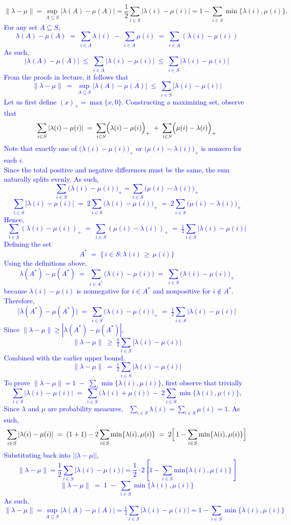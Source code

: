\documentclass{article}
\begin{document}
\[
\|\lambda - \mu\| = \sup_{A \subseteq S} |\lambda(A) - \mu(A)| = \frac{1}{2} \sum_{i \in S} |\lambda(i) - \mu(i)| = 1 - \sum_{i \in S} \min\{\lambda(i), \mu(i)\}.
\]
\textcolor{blue}{
For any set \(A \subseteq S\), 
\[
\lambda(A) - \mu(A) 
\;=\; \sum_{i \in A} \lambda(i) \;-\; \sum_{i \in A} \mu(i)
\;=\; \sum_{i \in A} (\lambda(i) - \mu(i))
\]
As such, 
\[
|\lambda(A) - \mu(A)|
\;\le\; \sum_{i \in A} |\lambda(i) - \mu(i)|
\;\le\; \sum_{i \in S} |\lambda(i) - \mu(i)|
\]
From the proofs in lecture, it follows that
\[
\|\lambda - \mu\| 
\;=\; \sup_{A \subseteq S} |\lambda(A) - \mu(A)|
\;\le\; \sum_{i \in S} |\lambda(i) - \mu(i)|
\]
Let us first define $(x)_+ = \max\{x,0\}$. Constructing a maximizing set, observe that 
\[
\sum_{i \in S} |\lambda(i) - \mu(i)|
\;=\; \sum_{i \in S} \Bigl(\lambda(i) - \mu(i)\Bigr)_+ 
\;+\; \sum_{i \in S} \Bigl(\mu(i) - \lambda(i)\Bigr)_+
\]
Note that exactly one of \(\bigl(\lambda(i)-\mu(i)\bigr)_+\) or \(\bigl(\mu(i)-\lambda(i)\bigr)_+\) is nonzero for each \(i\). \\
Since the total positive and negative differences must be the same, the sum naturally splits evenly. As such,
$$\sum_{i\in S}\bigl(\lambda(i)-\mu(i)\bigr)_+=\sum_{i \in S}\bigl(\mu(i)-\lambda(i)\bigr)_+$$
\[
\sum_{i \in S} \bigl|\lambda(i) - \mu(i)\bigr|
\;=\; 2 \sum_{i \in S} \bigl(\lambda(i) - \mu(i)\bigr)_+ 
\;=\; 2 \sum_{i \in S} \bigl(\mu(i) - \lambda(i)\bigr)_+
\]
Hence,
\[
\sum_{i \in S} (\lambda(i)-\mu(i))_+
\;=\;
\sum_{i \in S} (\mu(i)-\lambda(i))_+
\;=\;
\tfrac12 \sum_{i \in S} |\lambda(i) - \mu(i)|
\]
Defining the set
\[
A^* \;=\; \{\,i \in S : \lambda(i) \,\ge\, \mu(i)\}
\]
Using the definitions above,
\[
\lambda(A^*) - \mu(A^*)
\;=\; \sum_{i \in A^*} \bigl(\lambda(i) - \mu(i)\bigr)
\;=\; \sum_{i \in S} \bigl(\lambda(i)-\mu(i)\bigr)_+
\]
because \(\lambda(i)-\mu(i)\) is nonnegative for $i \in A^*$ and nonpositive for $i\notin A^*$. Therefore,
\[
\bigl|\lambda(A^*) - \mu(A^*)\bigr|
\;=\;
\sum_{i \in S} \bigl(\lambda(i)-\mu(i)\bigr)_+
\;=\;
\tfrac12 \sum_{i \in S} \bigl|\lambda(i) - \mu(i)\bigr|
\]
Since $\|\lambda-\mu\| \ge |\lambda(A^*) - \mu(A^*)|$, 
\[
\|\lambda - \mu\|
\;\ge\;
\tfrac12 \sum_{i \in S} \bigl|\lambda(i) - \mu(i)\bigr|
\]
Combined with the earlier upper bound,
\[
\|\lambda - \mu\|
\;=\;
\tfrac12 \sum_{i \in S} \bigl|\lambda(i) - \mu(i)\bigr|
\]
\medskip
\noindent
To prove \(\displaystyle \|\lambda - \mu\| = 1 \;-\;\sum_{i} \min\{\lambda(i), \mu(i)\}\), first observe that trivially
\[
\sum_{i \in S} |\lambda(i) - \mu(i)|
\;=\;
\sum_{i \in S} \bigl(\lambda(i) + \mu(i)\bigr)
\;-\; 2 \sum_{i \in S} \min\{\lambda(i), \mu(i)\},
\]
Since $\lambda$ and $\mu$ are probability measures, \ $\sum_{i \in S}\lambda(i)=\sum_{i \in S}\mu(i)=1$. As such,
\[
\sum_{i \in S} |\lambda(i) - \mu(i)|
\;=\;
(1+1) - 2\sum_{i \in S} \min\{\lambda(i), \mu(i)\}
\;=\;
2 \Bigl[\,1 - \sum_{i \in S} \min\{\lambda(i), \mu(i)\}\Bigr]
\]
Substituting back into $||\lambda - \mu||$,
$$\|\lambda-\mu\| = \frac12 \sum_{i \in S}|\lambda(i)-\mu(i)| = \frac12 \cdot 2 \left[1 - \sum_{i\in S}\text{min}\{\lambda (i), \mu (i)\}\right]$$
\[
\|\lambda - \mu\|
\;=\;
1 \;-\; \sum_{i \in S} \min\{\lambda(i), \mu(i)\}
\]
As such,
\[
\|\lambda - \mu\| = \sup_{A \subseteq S} \bigl|\lambda(A) - \mu(A)\bigr| = 
\tfrac12 \sum_{i \in S} |\lambda(i) - \mu(i)|  =
1 - \sum_{i \in S} \min\{\lambda(i), \mu(i)\}
\]
}
\end{document}
